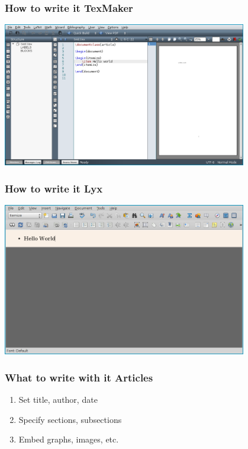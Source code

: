 \documentclass{beamer}
\begin{document}
\begin{frame}
    \frametitle{How to write it \textendash{} TexMaker}
    \begin{center}
        \includegraphics[width=0.8\textwidth]{img/texmaker.png}
    \end{center}
\end{frame}

\begin{frame}
    \frametitle{How to write it \textendash{} Lyx}
    \begin{center}
        \includegraphics[width=0.8\textwidth]{img/lyx.png}
    \end{center}
\end{frame}

\begin{frame}[t]
    \frametitle{What to write with it \textendash{} Articles}
    
    \begin{enumerate}
        \item Set title, author, date
        \item Specify sections, subsections
        \item Embed graphs, images, etc.
    \end{enumerate}
\end{frame}
\end{document}
